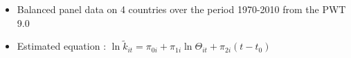 \documentclass{beamer}
\begin{document}
		\begin{frame}
			\begin{itemize}
				\item Balanced panel data on 4 countries over the period 1970-2010 from the PWT 9.0
			\end{itemize}
			\vspace{1em}
			\begin{itemize}
				\item Estimated equation : $ \ln \tilde{k}_{it} = \pi_{0i} + \pi_{1i} \ln \Theta_{it} + \pi_{2i}(t-t_0)$
			\end{itemize}
			\vspace{-1em}
			\begin{center}
			\resizebox{11cm}{!}{}
			\end{center}
			\hyperlink{paraminit<1>}{}
		\end{frame}
	

	
\end{document}
